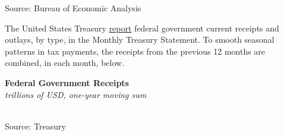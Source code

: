 \documentclass{report}
\makeatletter
\newcommand{\tbllink}[1]{\href{https://raw.githubusercontent.com/bdecon/US-chartbook/master/chartbook/data/#1}{\faTable}}
\newcommand*\short[1]{\expandafter\@gobbletwo\number\numexpr#1\relax}
\newcommand{\absnode}[3]{\node[below right, align=left] at (axis cs: #1,#2) {#3};}
\newcommand{\ltdateaxisticks}{
		date coordinates in=x, axis line style={draw=none},
		xmax={2023-11-01},
		max space between ticks=40,	    
		xtick={{2013-01-01}, {2014-01-01}, {2015-01-01}, {2016-01-01}, {2017-01-01}, {2018-01-01}, 
		    {2019-01-01}, {2020-01-01}, {2021-01-01}, {2022-01-01}, {2023-01-01}, {2024-01-01}},
		enlarge y limits={0.06}, enlarge x limits={0.01},
		}
\newcommand{\bbar}[2]{extra #1 ticks = {{#2}}, extra #1 tick labels = ,
		extra #1 tick style = {grid=major, grid style={thick, black!25}},}
\newcommand{\stdline}[4]{\addplot[very thick, no markers, color=#1] 
		table [x=#2, y=#3, col sep=comma] {#4};	}
\newcommand{\rbar}{
		\fill[color=black!10] (axis cs:{2020-02-01},\pgfkeysvalueof{/pgfplots/ymin}) rectangle 
			(axis cs:{2020-05-01}, \pgfkeysvalueof{/pgfplots/ymax});}
\makeatother
\begin{document}
{\begin{minipage}{0.39\textwidth}
\footnotesize{Source: Bureau of Economic Analysis} \hfill \tbllink{fed_gov_rec_type.csv}
\end{minipage} \hspace{5mm} \begin{minipage}{0.33\textwidth}
\small 
\end{minipage}
\newpage
\begin{minipage}{0.76\textwidth}
\small The United States Treasury \href{https://fiscal.treasury.gov/reports-statements/mts/current.html}{report} federal government current receipts and outlays, by type, in the Monthly Treasury Statement. To smooth seasonal patterns in tax payments, the receipts from the previous 12 months are combined, in each month, below. 
\end{minipage}  

\begin{minipage}{0.45\textwidth}
\normalsize \textbf{Federal Government Receipts}\\
\footnotesize{\textit{trillions of USD, one-year moving sum}}\\
\hspace*{-2mm} \\
\footnotesize{Source: Treasury} \hfill \tbllink{tmb_rec.csv} \ \ 
\end{minipage} \hspace{5mm}
\begin{minipage}{0.27\textwidth}
\small 
\end{minipage}
\vspace{4mm}

}
\end{document}

